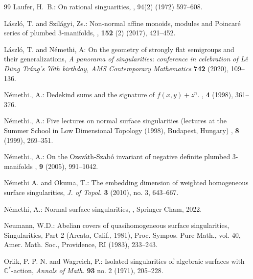 \documentclass[oneside]{amsart}
\numberwithin{equation}{section}
\numberwithin{equation}{subsection}
\theoremstyle{plain}
\theoremstyle{definition}
\begin{document}
\begin{thebibliography}{99}
Laufer, H.~B.:
\newblock On rational singuarities,
, 94(2) (1972) 597--608.

L\'aszl\'o, T. and Szil\'agyi, Zs.: Non-normal affine monoids, modules and Poincar\'e series of plumbed 
  3-manifolds, , {\bf 152} (2) (2017), 421--452.  

L\'aszl\'o, T. and N\'emethi, A:  On the geometry of strongly flat semigroups and their generalizations, 
{\em A panorama of singularities: conference in celebration of L\^e
  D\~ung Tr\'ang's 70th birthday, AMS Contemporary Mathematics} {\bf 742} (2020), 109--136.
  



N\'emethi., A.:
\newblock Dedekind sums and the signature of $f(x,y)+z^n$.
, {\bf 4} (1998), 361--376.

N\'emethi., A.: Five lectures on normal surface singularities  (lectures at the Summer School in Low Dimensional Topology (1998), Budapest, Hungary)
, \textbf{8} (1999), 269--351.

N\'emethi., A.: On the {O}zsv\'{a}th-{S}zab\'{o} invariant of negative
 definite plumbed 3-manifolds
, \textbf{9} (2005), 991--1042.

N\'emethi A. and Okuma, T.:  The embedding dimension of weighted homogeneous surface singularities, {\em J. of Topol.}  {\bf 3} (2010), no. 3, 643--667.


N\'emethi, A.: Normal surface singularities, , Springer Cham, 2022.


Neumann, W.D.: Abelian covers of quasihomogeneous surface singularities,
Singularities, Part 2 (Arcata, Calif., 1981), Proc. Sympos. Pure Math., vol. 40,
Amer. Math. Soc., Providence, RI (1983), 233--243.

Orlik, P. P. N. and Wagreich, P.: Isolated singularities of algebraic surfaces with $\mathbb{C}^*$-action, {\em Annals
of Math.} {\bf 93} no. 2 (1971), 205--228. 


\end{thebibliography}
\end{document}
